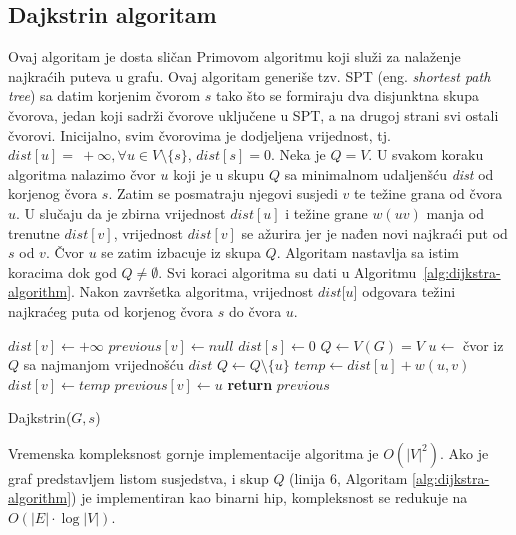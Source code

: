 \documentclass[a4paper, utf8, 11pt, colorlinks]{book}
\begin{document}
\subsection{Dajkstrin algoritam}

Ovaj algoritam je dosta sličan Primovom algoritmu koji služi za nalaženje najkraćih puteva u grafu. Ovaj algoritam generiše tzv. SPT (eng. \emph{shortest path tree}) sa datim korjenim čvorom $s$ tako  što se formiraju dva disjunktna skupa čvorova, jedan koji sadrži čvorove uključene u SPT, a na drugoj strani svi ostali čvorovi. Inicijalno, svim čvorovima je dodjeljena vrijednost, tj. $dist[u]=\ +\infty, \forall u \in V\setminus \{s\}$, $dist[s]=0$. Neka je $Q = V$. 
U svakom koraku algoritma nalazimo čvor $u$ koji je u skupu $Q$ sa minimalnom udaljenšću \emph{dist} od korjenog čvora $s$. Zatim se posmatraju njegovi susjedi $v$ te težine grana od čvora $u$. U slučaju da je zbirna vrijednost $dist[u]$  i težine grane $w(uv)$ manja od trenutne $dist[v]$, vrijednost $dist[v]$ se ažurira jer je nađen novi najkraći put od $s$ od $v$.  Čvor $u$ se zatim izbacuje iz skupa $Q$. Algoritam nastavlja sa istim koracima dok god $Q \neq \emptyset$. 
Svi koraci algoritma su dati u Algoritmu~\ref{alg:dijkstra-algorithm}. Nakon završetka algoritma, vrijednost $dist$[$u$] odgovara težini najkraćeg puta od korjenog čvora $s$ do čvora $u$. 


\begin{algorithm}[!ht]
	\begin{algorithmic}[1]
	      	\STATE   $dist[v] \gets +\infty$ 	%
		    \STATE $previous[v] \gets null$ 	%
		\ENDFOR
		\STATE	$dist[s] \gets 0$ 	 
		\STATE	$Q \gets V(G)=V$
		\STATE $u \gets$ čvor iz $Q$ sa najmanjom vrijednošću $dist$
		\STATE $Q \gets Q \setminus \{u\}$
		\STATE $temp \gets dist[u] + w(u, v)$
		\STATE  $dist[v] \gets temp$
		\STATE $previous[v] \gets u$ 
		\ENDIF
		\ENDFOR
		\ENDWHILE
		\STATE	\textbf{return} $previous$ 
	\end{algorithmic}
    		\caption{Dajkstrin($G,s $)}\label{alg:dijkstra-algorithm}
\end{algorithm}

Vremenska kompleksnost gornje implementacije algoritma je $O(|V|^2)$. Ako je graf predstavljem listom susjedstva, i skup $Q$ (linija 6, Algoritam \ref{alg:dijkstra-algorithm}) je implementiran kao binarni hip, 
kompleksnost se redukuje na $O(|E| \cdot \log |V|)$.
\end{document}

